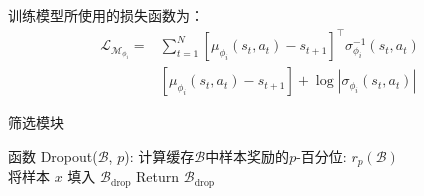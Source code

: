 训练模型所使用的损失函数为：
\begin{equation}
\begin{split}
    \mathcal{L}_{\mathcal{M}_{\phi_i}} =& \sum_{t=1}^N[\mu_{\phi_i}(s_t,a_t)-s_{t+1}]^\top\sigma_{\phi_i}^{-1}(s_t,a_t)\\
    &[\mu_{\phi_i}(s_t,a_t)-s_{t+1}] + \log|\sigma_{\phi_i}(s_t,a_t)|
\end{split}
\end{equation}

\begin{algorithm}[ht]
\caption{筛选模块}
\begin{algorithmic}
\STATE 函数 Dropout($\mathcal{B}$, $p$):
    \STATE 计算缓存$\mathcal{B}$中样本奖励的$p$-百分位: $r_p(\mathcal{B})$\\
            \STATE 将样本 $x$ 填入 $\mathcal{B}_{\mathrm{drop}}$
        \ENDIF
    \ENDFOR
    \STATE Return $\mathcal{B}_{\mathrm{drop}}$
\end{algorithmic}
\end{algorithm}


